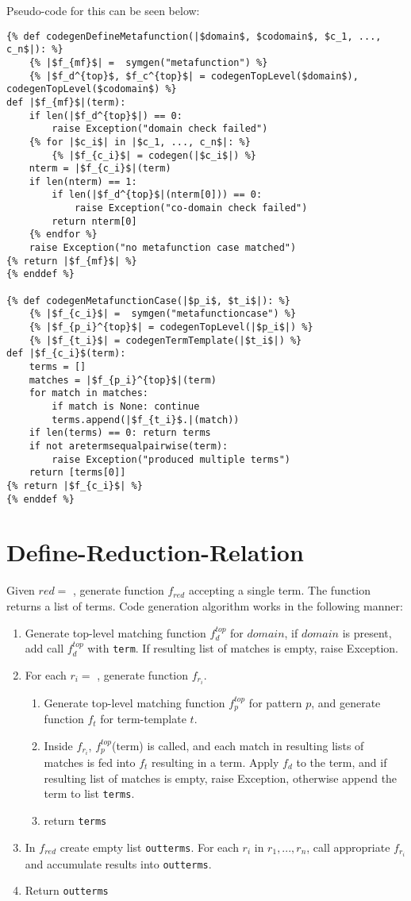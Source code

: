 Pseudo-code for this can be seen below:

\begin{verbatim}
{% def codegenDefineMetafunction(|$domain$, $codomain$, $c_1, ..., c_n$|): %}
	{% |$f_{mf}$| =  symgen("metafunction") %}
	{% |$f_d^{top}$, $f_c^{top}$| = codegenTopLevel($domain$), codegenTopLevel($codomain$) %}
def |$f_{mf}$|(term):
	if len(|$f_d^{top}$|) == 0: 
		raise Exception("domain check failed")
	{% for |$c_i$| in |$c_1, ..., c_n$|: %}
		{% |$f_{c_i}$| = codegen(|$c_i$|) %}
	nterm = |$f_{c_i}$|(term)
	if len(nterm) == 1:
		if len(|$f_d^{top}$|(nterm[0])) == 0:
			raise Exception("co-domain check failed")
		return nterm[0]
	{% endfor %}
	raise Exception("no metafunction case matched")
{% return |$f_{mf}$| %}
{% enddef %}

{% def codegenMetafunctionCase(|$p_i$, $t_i$|): %}
	{% |$f_{c_i}$| =  symgen("metafunctioncase") %}
	{% |$f_{p_i}^{top}$| = codegenTopLevel(|$p_i$|) %}
	{% |$f_{t_i}$| = codegenTermTemplate(|$t_i$|) %}
def |$f_{c_i}$(term):
	terms = []
	matches = |$f_{p_i}^{top}$|(term)
	for match in matches:
		if match is None: continue
		terms.append(|$f_{t_i}$.|(match))
	if len(terms) == 0: return terms 
	if not aretermsequalpairwise(term):
		raise Exception("produced multiple terms")
	return [terms[0]]
{% return |$f_{c_i}$| %}
{% enddef %}
\end{verbatim}

\section{Define-Reduction-Relation}
Given $red=$ \DefineReductionRelation, generate function $f_{red}$ accepting a single term. The function returns a list of terms. Code generation algorithm works in the following manner:

\begin{enumerate}
\item Generate top-level matching function $f_d^{top}$ for $domain$, if $domain$ is present, add call $f_d^{top}$ with \texttt{term}. If resulting list of matches is empty, raise Exception.
\item For each $r_i= $ \ReductionCase, generate function $f_{r_i}$.
	\begin{enumerate}
	\item Generate top-level matching function $f_p^{top}$ for pattern $p$, and generate function $f_t$ for term-template $t$.
	\item Inside $f_{r_i}$, $f_p^{top}$(term) is called, and each match in resulting lists of matches is fed into $f_t$ resulting in a term. Apply $f_d$ to the term, and if resulting list of matches is empty, raise Exception, otherwise append the term to list \texttt{terms}.
	\item return \texttt{terms}
	\end{enumerate}
\item In $f_{red}$ create empty list \texttt{outterms}. For each $r_i$ in $r_1, ..., r_n$, call appropriate $f_{r_i}$ and accumulate results into \texttt{outterms}.
\item Return \texttt{outterms}
\end{enumerate}

